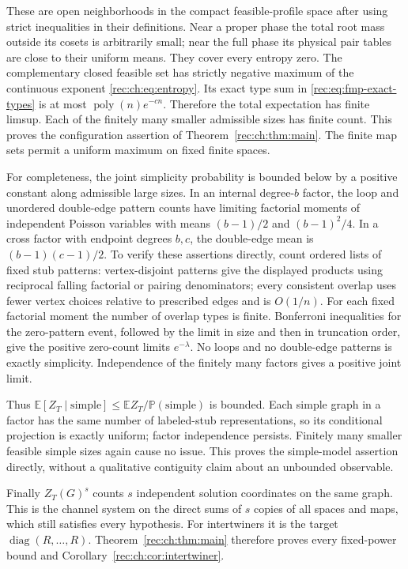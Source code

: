 \documentclass[11pt]{article}
\theoremstyle{definition}
\theoremstyle{remark}
\newcommand{\E}{\mathbb E}
\newcommand{\1}{\mathbf 1}
\providecommand{\Prob}{\mathbb P}
\begin{document}
These are open neighborhoods in the compact feasible-profile space after using strict inequalities in their definitions. Near a proper phase the total root mass outside its cosets is arbitrarily small; near the full phase its physical pair tables are close to their uniform means. They cover every entropy zero. The complementary closed feasible set has strictly negative maximum of the continuous exponent \eqref{rec:ch:eq:entropy}. Its exact type sum in \eqref{rec:eq:fmp-exact-types} is at most $\operatorname{poly}(n)e^{-cn}$. Therefore the total expectation has finite limsup. Each of the finitely many smaller admissible sizes has finite count. This proves the configuration assertion of Theorem~\ref{rec:ch:thm:main}. The finite map sets permit a uniform maximum on fixed finite spaces.

For completeness, the joint simplicity probability is bounded below by a positive constant along admissible large sizes. In an internal degree-$b$ factor, the loop and unordered double-edge pattern counts have limiting factorial moments of independent Poisson variables with means $(b-1)/2$ and $(b-1)^2/4$. In a cross factor with endpoint degrees $b,c$, the double-edge mean is $(b-1)(c-1)/2$. To verify these assertions directly, count ordered lists of fixed stub patterns: vertex-disjoint patterns give the displayed products using reciprocal falling factorial or pairing denominators; every consistent overlap uses fewer vertex choices relative to prescribed edges and is $O(1/n)$. For each fixed factorial moment the number of overlap types is finite. Bonferroni inequalities for the zero-pattern event, followed by the limit in size and then in truncation order, give the positive zero-count limits $e^{-\lambda}$. No loops and no double-edge patterns is exactly simplicity. Independence of the finitely many factors gives a positive joint limit.

Thus $\E[Z_T\mid\mathrm{simple}]\le\E Z_T/\Prob(\mathrm{simple})$ is bounded. Each simple graph in a factor has the same number of labeled-stub representations, so its conditional projection is exactly uniform; factor independence persists. Finitely many smaller feasible simple sizes again cause no issue. This proves the simple-model assertion directly, without a qualitative contiguity claim about an unbounded observable.

Finally $Z_T(G)^s$ counts $s$ independent solution coordinates on the same graph. This is the channel system on the direct sums of $s$ copies of all spaces and maps, which still satisfies every hypothesis. For intertwiners it is the target $\operatorname{diag}(R,\ldots,R)$. Theorem~\ref{rec:ch:thm:main} therefore proves every fixed-power bound and Corollary~\ref{rec:ch:cor:intertwiner}.
\end{document}
